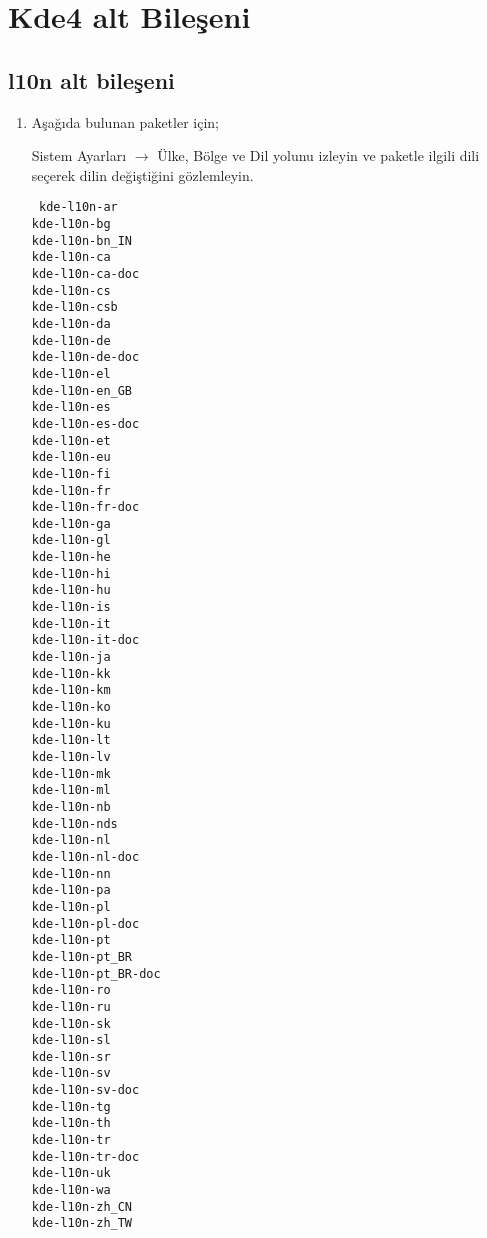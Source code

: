 \documentclass[a4paper,10pt]{article}
\begin{document}
\section{Kde4 alt Bileşeni}

\subsection*{l10n alt bileşeni}

\begin{enumerate} 
 \item Aşağıda bulunan paketler için; 

Sistem Ayarları $\rightarrow$ Ülke, Bölge ve Dil yolunu izleyin ve paketle ilgili dili seçerek dilin değiştiğini gözlemleyin. 

\begin{verbatim}
 kde-l10n-ar
kde-l10n-bg
kde-l10n-bn_IN
kde-l10n-ca
kde-l10n-ca-doc
kde-l10n-cs
kde-l10n-csb
kde-l10n-da
kde-l10n-de
kde-l10n-de-doc
kde-l10n-el
kde-l10n-en_GB
kde-l10n-es
kde-l10n-es-doc
kde-l10n-et
kde-l10n-eu
kde-l10n-fi
kde-l10n-fr
kde-l10n-fr-doc
kde-l10n-ga
kde-l10n-gl
kde-l10n-he
kde-l10n-hi
kde-l10n-hu
kde-l10n-is
kde-l10n-it
kde-l10n-it-doc
kde-l10n-ja
kde-l10n-kk
kde-l10n-km
kde-l10n-ko
kde-l10n-ku
kde-l10n-lt
kde-l10n-lv
kde-l10n-mk
kde-l10n-ml
kde-l10n-nb
kde-l10n-nds
kde-l10n-nl
kde-l10n-nl-doc
kde-l10n-nn
kde-l10n-pa
kde-l10n-pl
kde-l10n-pl-doc
kde-l10n-pt
kde-l10n-pt_BR
kde-l10n-pt_BR-doc
kde-l10n-ro
kde-l10n-ru
kde-l10n-sk
kde-l10n-sl
kde-l10n-sr
kde-l10n-sv
kde-l10n-sv-doc
kde-l10n-tg
kde-l10n-th
kde-l10n-tr
kde-l10n-tr-doc
kde-l10n-uk
kde-l10n-wa
kde-l10n-zh_CN
kde-l10n-zh_TW
\end{verbatim}

\end{enumerate}
\end{document}
